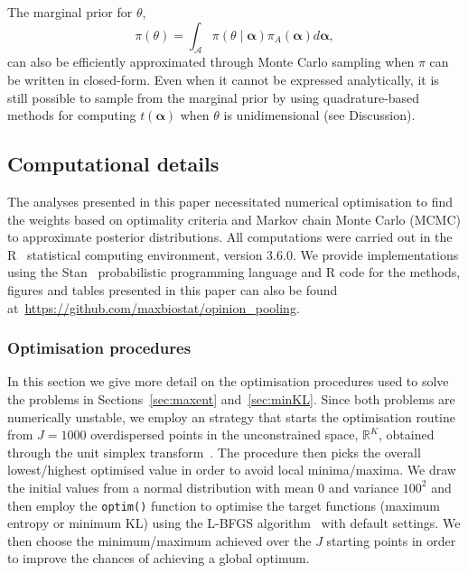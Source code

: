 \documentclass[a4paper, notitlepage, 10pt]{article}
\begin{document}
The marginal prior for $\theta$,
\begin{equation}
\label{eq:marginalbeta}
\pi(\theta) = \int_{\mathcal{A}} \pi(\theta \mid \boldsymbol\alpha) \pi_A(\boldsymbol\alpha)d\boldsymbol\alpha,
\end{equation}
can also be efficiently approximated through Monte Carlo sampling when $\pi$ can be written in closed-form.
Even when it cannot be expressed analytically, it is still possible to sample from the marginal prior by using quadrature-based methods for computing $t(\boldsymbol\alpha)$ when $\theta$ is unidimensional (see Discussion).

\subsection{Computational details}
\label{sec:computation}

The analyses presented in this paper necessitated numerical optimisation to find the weights based on optimality criteria and Markov chain Monte Carlo (MCMC) to approximate posterior distributions.
All computations were carried out in the R~\citep{R2019} statistical computing environment, version 3.6.0. 
We provide implementations using the Stan~\citep{Carpenter2017} probabilistic programming language and R code for the methods, figures and tables presented in this paper can also be found at~\url{https://github.com/maxbiostat/opinion_pooling}.

\subsubsection{Optimisation procedures}
\label{sec:computation_opt}

In this section we give more detail on the optimisation procedures used to solve the problems in Sections~\ref{sec:maxent} and~\ref{sec:minKL}.
Since both problems are numerically unstable, we employ an strategy that starts the optimisation routine from $J = 1000$ overdispersed points in the unconstrained space, $\mathbb{R}^K$, obtained through the unit simplex transform~\citep{Betancourt2012}.
The procedure then picks the overall lowest/highest optimised value in order to avoid local minima/maxima.
We draw the initial values from a normal distribution with mean $0$ and variance $100^2$ and then employ the \verb|optim()| function to optimise the target functions (maximum entropy or minimum KL) using the L-BFGS algorithm~\citep{Byrd1995} with default settings.
We then choose the minimum/maximum achieved over the $J$ starting points in order to improve the chances of achieving a global optimum.
\end{document}
